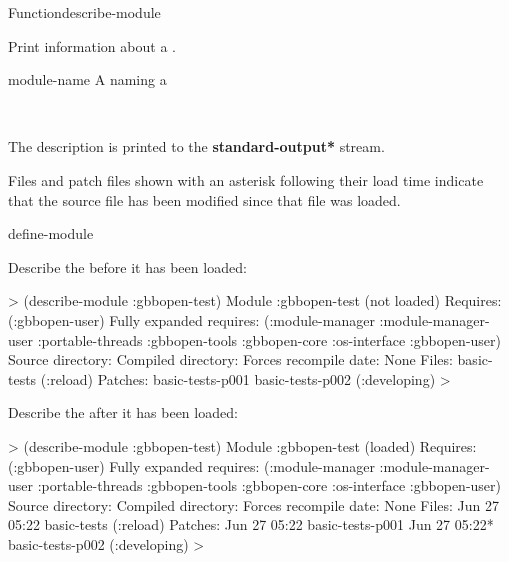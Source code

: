 \documentclass[10pt,twoside,english,pdftex]{article}
\begin{document}
\begin{functiondoc}{Function}{describe-module}{}
%
%
%

\fnsyntax 

\fnpurpose Print information about a .

\fnpackage {}

\fnmodule {}

\fnargs
\begin{args}{module-name}
 A  naming a 
\end{args}

\fnerrors
\modulenotdefined\\
\relativedircircularity

\fndescription
{}%
The description is printed to the {\bf *standard-output*} stream.

Files and patch files shown with an asterisk following their load time
indicate that the source file has been modified since that file was loaded.

\begin{alsos}{define-module}
\end{alsos}

\fnexamples
Describe the   before it has been loaded:
%
\W\supp
\begin{example}
  > (describe-module :gbbopen-test)
  Module :gbbopen-test (not loaded)
    Requires: (:gbbopen-user)
    Fully expanded requires: (:module-manager :module-manager-user :portable-threads
                              :gbbopen-tools :gbbopen-core :os-interface :gbbopen-user)
    Source directory: 
    Compiled directory: 
    Forces recompile date: None
    Files:                 basic-tests (:reload)
    Patches:               basic-tests-p001 
                           basic-tests-p002 (:developing)
  >
\end{example}

Describe the   after it has been loaded:
%
\W\supp
\begin{example}
  > (describe-module :gbbopen-test)
  Module :gbbopen-test (loaded)
    Requires: (:gbbopen-user)
    Fully expanded requires: (:module-manager :module-manager-user :portable-threads
                              :gbbopen-tools :gbbopen-core :os-interface :gbbopen-user)
    Source directory: 
    Compiled directory: 
    Forces recompile date: None
    Files:   Jun 27 05:22  basic-tests (:reload)
    Patches: Jun 27 05:22  basic-tests-p001 
             Jun 27 05:22* basic-tests-p002 (:developing)
  >
\end{example}

\end{functiondoc}
\end{document}

